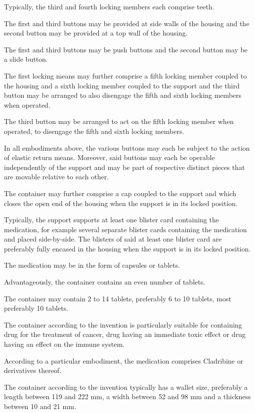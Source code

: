 \documentclass[11pt,a4paper]{article}
\begin{document}
Typically, the third and fourth locking members each comprise teeth.

The first and third buttons may be provided at side walls of the housing and the second button may be provided at a top wall of the housing.

The first and third buttons may be push buttons and the second button may be a slide button.

The first locking means may further comprise a fifth locking member coupled to the housing and a sixth locking member coupled to the support and the third button may be arranged to also disengage the fifth and sixth locking members when operated.

The third button may be arranged to act on the fifth locking member when operated, to disengage the fifth and sixth locking members.

In all embodiments above, the various buttons may each be subject to the action of elastic return means. Moreover, said buttons may each be operable independently of the support and may be part of respective distinct pieces that are movable relative to each other.

The container may further comprise a cap coupled to the support and which closes the open end of the housing when the support is in its locked position.

Typically, the support supports at least one blister card containing the medication, for example several separate blister cards containing the medication and placed side-by-side. The blisters of said at least one blister card are preferably fully encased in the housing when the support is in its locked position.

The medication may be in the form of capsules or tablets.

Advantageously, the container contains an even number of tablets.

The container may contain 2 to 14 tablets, preferably 6 to 10 tablets, most preferably 10 tablets.

The container according to the invention is particularly suitable for containing drug for the treatment of cancer, drug having an immediate toxic effect or drug having an effect on the immune system.

According to a particular embodiment, the medication comprises Cladribine or derivatives thereof.

The container according to the invention typically has a wallet size, preferably a length between 119 and 222 mm, a width between 52 and 98 mm and a thickness between 10 and 21 mm.
\end{document}
